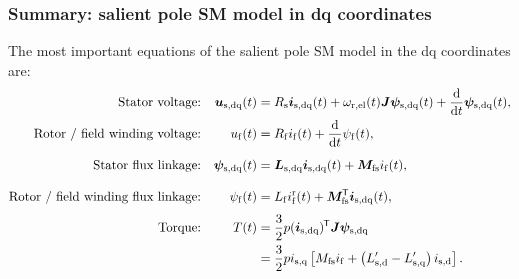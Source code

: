 \begin{frame}
	\frametitle{Summary: salient pole SM model in dq coordinates}
    The most important equations of the salient pole SM model in the  dq coordinates are:
	\begin{equation*}
		\begin{alignedat}{4}
			&&\mbox{Stator voltage:}&& \quad\bm{u}_\mathrm{s,dq}(&t) &&= R_\mathrm{s} \bm{i}_\mathrm{s,dq}(t)+ \omega_\mathrm{r,el}(t)\bm{J}\bm{\psi}_\mathrm{s,dq}(t) + \frac{\mathrm{d}}{\mathrm{d}t}\bm{\psi}_\mathrm{s,dq}(t),\\
			&&\mbox{Rotor / field winding  voltage:}&& \quad u_\mathrm{f}(&t) &&= R_\mathrm{f}i_\mathrm{f}(t)+\frac{\mathrm{d}}{\mathrm{d}t}\psi_\mathrm{f}(t),\\
			&&\mbox{Stator flux linkage:}&& \quad \bm{\psi}_\mathrm{s,dq}(&t) &&= \bm{L}_\mathrm{s,dq}\bm{i}_{\mathrm{s,dq}}(t) + \bm{M}_\mathrm{fs} i_{\mathrm{f}}(t), \vphantom{\frac{\mathrm{d}}{\mathrm{d}t}}\\
			&&\mbox{Rotor / field winding flux linkage:}&& \psi_\mathrm{f}(&t) &&= L_\mathrm{f} i^\mathrm{r}_\mathrm{f}(t) + \bm{M}\T_\mathrm{fs} \bm{i}_\mathrm{s,dq}(t),\vphantom{\frac{\mathrm{d}}{\mathrm{d}t}}\\
			&&\mbox{Torque:}&& \quad T(&t) &&= \frac{3}{2} p (\bm{i}_\mathrm{s,dq})\T\bm{J}\bm{\psi}_\mathrm{s,dq}\\
			&&&&&&&=\frac{3}{2} p i_\mathrm{s,q}\left[ M_\mathrm{fs} i_{\mathrm{f}} + \left(L'_\mathrm{s,d}-L'_\mathrm{s,q}\right)i_\mathrm{s,d}\right].
		\end{alignedat}
	\end{equation*}      
\end{frame}

